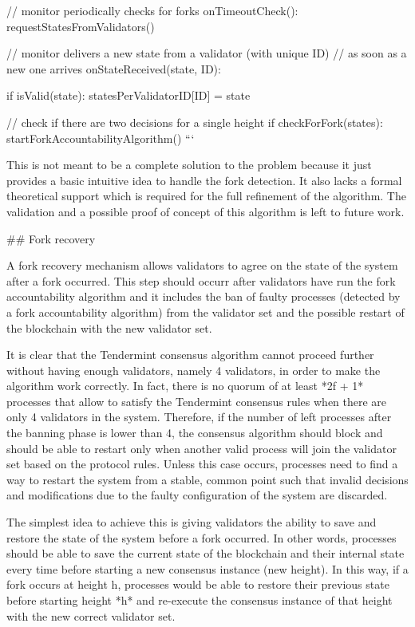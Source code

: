 \documentclass[a4paper,11pt,oneside]{report}
\begin{document}
\begin{markdown}
    // monitor periodically checks for forks 
    onTimeoutCheck():
        requestStatesFromValidators()   

    // monitor delivers a new state from a validator (with unique ID)
    // as soon as a new one arrives
    onStateReceived(state, ID):
    
	    if isValid(state):
            statesPerValidatorID[ID] = state

		    // check if there are two decisions for a single height
		    if checkForFork(states):
                startForkAccountabilityAlgorithm()
    ```

This is not meant to be a complete solution to the problem because it just provides a basic intuitive idea to handle the fork detection. It also lacks a formal theoretical support which is required for the full refinement of the algorithm.
The validation and a possible proof of concept of this algorithm is left to future work.

## Fork recovery

A fork recovery mechanism allows validators to agree on the state of the system after a fork occurred. 
This step should occurr after validators have run the fork accountability algorithm and it includes the ban of faulty processes (detected by a fork accountability algorithm) from the validator set and the possible restart of the blockchain with the new validator set.

It is clear that the Tendermint consensus algorithm cannot proceed further without having enough validators, namely 4 validators, in order to make the algorithm work correctly. In fact, there is no quorum of at least *2f + 1* processes that allow to satisfy the Tendermint consensus rules when there are only 4 validators in the system. 
Therefore, if the number of left processes after the banning phase is lower than 4, the consensus algorithm should block and should be able to restart only when another valid process will join the validator set based on the protocol rules.
Unless this case occurs, processes need to find a way to restart the system from a stable, common point such that invalid decisions and modifications due to the faulty configuration of the system are discarded.

The simplest idea to achieve this is giving validators the ability to save and restore the state of the system before a fork occurred.
In other words, processes should be able to save the current state of the blockchain and their internal state every time before starting a new consensus instance (new height). In this way, if a fork occurs at height h, processes would be able to restore their previous state before starting height *h* and re-execute the consensus instance of that height with the new correct validator set.


\end{markdown}
\end{document}
